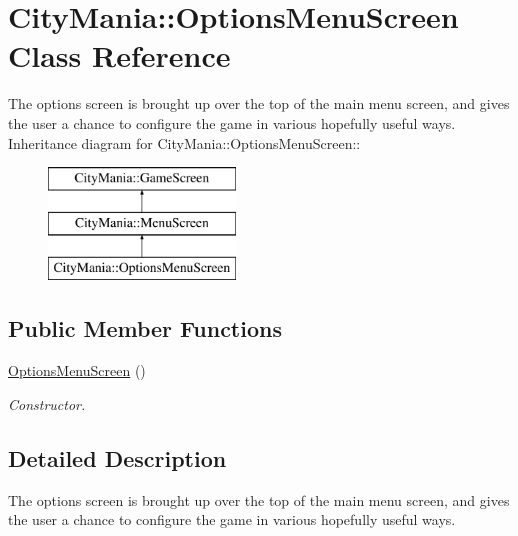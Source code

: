 \hypertarget{classCityMania_1_1OptionsMenuScreen}{
\section{CityMania::OptionsMenuScreen Class Reference}
\label{classCityMania_1_1OptionsMenuScreen}
}


The options screen is brought up over the top of the main menu screen, and gives the user a chance to configure the game in various hopefully useful ways.  
Inheritance diagram for CityMania::OptionsMenuScreen::\begin{figure}[H]
\begin{center}
\leavevmode
\includegraphics[height=3cm]{classCityMania_1_1OptionsMenuScreen}
\end{center}
\end{figure}
\subsection*{Public Member Functions}
\begin{DoxyCompactItemize}
\item 
\hyperlink{classCityMania_1_1OptionsMenuScreen_aa739d5914c1ecd766a0ae98e83ca2f1a}{OptionsMenuScreen} ()
\begin{DoxyCompactList}\small\item\em Constructor. \item\end{DoxyCompactList}\end{DoxyCompactItemize}


\subsection{Detailed Description}
The options screen is brought up over the top of the main menu screen, and gives the user a chance to configure the game in various hopefully useful ways. 


